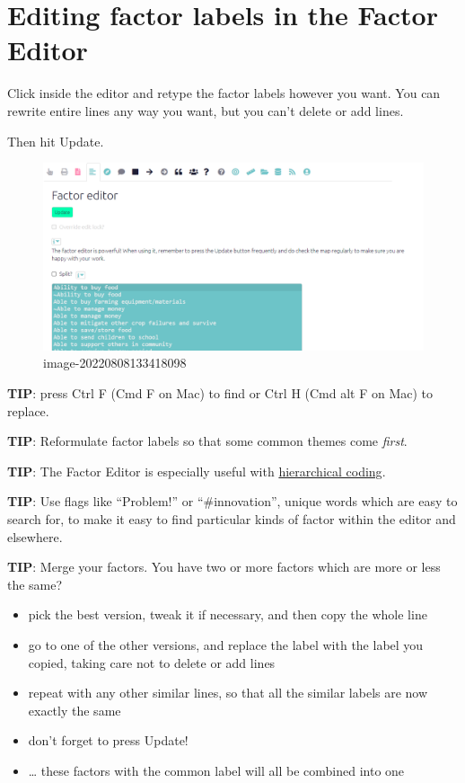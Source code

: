 \documentclass[
]{book}
\providecommand{\tightlist}{%
  \setlength{\itemsep}{0pt}\setlength{\parskip}{0pt}}
\begin{document}
\hypertarget{editing-factor-labels-in-the-factor-editor}{%
\section{Editing factor labels in the Factor Editor}\label{editing-factor-labels-in-the-factor-editor}}

Click inside the editor and retype the factor labels however you want. You can rewrite entire lines any way you want, but you can't delete or add lines.

Then hit Update.

\begin{figure}
\centering
\includegraphics[width=6.77083in,height=\textheight]{_assets/image-20220808133418098.png}
\caption{image-20220808133418098}
\end{figure}

\textbf{TIP}: press Ctrl F (Cmd F on Mac) to find or Ctrl H (Cmd alt F on Mac) to replace.

\textbf{TIP}: Reformulate factor labels so that some common themes come \emph{first}.

\textbf{TIP}: The Factor Editor is especially useful with \href{\%7B\#xhierarchical-coding\%7D}{hierarchical coding}.

\textbf{TIP}: Use flags like ``Problem!'' or ``\#innovation'', unique words which are easy to search for, to make it easy to find particular kinds of factor within the editor and elsewhere.

\textbf{TIP}: Merge your factors. You have two or more factors which are more or less the same?

\begin{itemize}
\tightlist
\item
  pick the best version, tweak it if necessary, and then copy the whole line
\item
  go to one of the other versions, and replace the label with the label you copied, taking care not to delete or add lines
\item
  repeat with any other similar lines, so that all the similar labels are now exactly the same
\item
  don't forget to press Update!
\item
  \ldots{} these factors with the common label will all be combined into one
\end{itemize}
\end{document}
